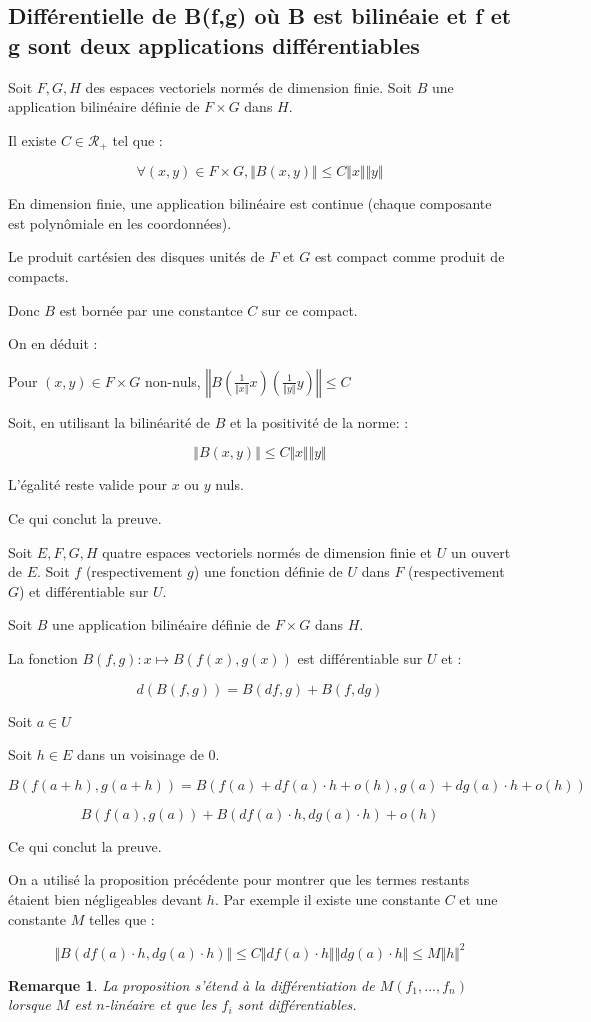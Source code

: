 \documentclass[a4paper,12pt]{book}
\newcommand{\Prop}[2]{\begin{tcolorbox}[sharp corners, colback=white,colframe=red!90!black!75, title=Proposition : #1]#2\end{tcolorbox}}
\newcommand{\Pre}[1]{\begin{tcolorbox}[sharp corners, colback=white,colframe=green!60!green!30!black!75, title=Preuve]#1\end{tcolorbox}}
\newtheorem{Rem}{Remarque}[section]
\begin{document}
\subsection{Différentielle de B(f,g) où B est bilinéaie et f et g sont deux applications différentiables}
\Prop{}{Soit $F, G, H$ des espaces vectoriels normés de dimension finie. Soit $B$ une application bilinéaire définie de $F\times G$ dans $H$.
\par Il existe $C\in\mathcal{R}_+$ tel que :
\par $$\forall (x, y)\in F\times G, \Vert B(x, y)\Vert\leq C\Vert x\Vert\Vert y\Vert$$}
\Pre{En dimension finie, une application bilinéaire est continue (chaque composante est polynômiale en les coordonnées).
\par Le produit cartésien des disques unités de $F$ et $G$ est compact comme produit de compacts.
\par Donc $B$ est bornée par une constantce $C$ sur ce compact.
\par On en déduit :
\par Pour $(x,y)\in F\times G$ non-nuls, $\left\Vert B\left(\frac{1}{\Vert x\Vert}x\right)\left(\frac{1}{\Vert y\Vert}y\right)\right\Vert\leq C$
\par Soit, en utilisant la bilinéarité de $B$ et la positivité de la norme: :
\par $$ \Vert B(x, y)\Vert\leq C\Vert x\Vert\Vert y\Vert$$
\par L'égalité reste valide pour $x$ ou $y$ nuls.
\par Ce qui conclut la preuve.}
\Prop{}{Soit $E, F, G, H$ quatre espaces vectoriels normés de dimension finie et $U$ un ouvert de $E$. Soit $f$ (respectivement $g$) une fonction définie de $U$ dans $F$ (respectivement $G$) et différentiable sur $U$.
\par Soit $B$ une application bilinéaire définie de $F\times G$ dans $H$.
\par La fonction $B(f, g):x\mapsto B(f(x), g(x))$ est différentiable sur $U$ et :
\par $$d(B(f, g)) = B(df, g)+B(f, dg)$$}
\Pre{Soit $a\in U$
\par Soit $h\in E$ dans un voisinage de $0$.
\par $$B(f(a+h), g(a+h)) = B(f(a)+df(a)\cdot h+o(h), g(a)+dg(a)\cdot h+o(h))$$
\par $$B(f(a), g(a))+B(df(a)\cdot h, dg(a)\cdot h)+o(h)$$
\par Ce qui conclut la preuve.
\par On a utilisé la proposition précédente pour montrer que les termes restants étaient bien négligeables devant $h$. Par exemple il existe une constante $C$ et une constante $M$ telles que :
\par $$ \Vert B(df(a)\cdot h, dg(a)\cdot h)\Vert\leq C\Vert df(a)\cdot h\Vert\Vert dg(a)\cdot h\Vert\leq M\Vert h\Vert^2$$}
\begin{Rem}
La proposition s'étend à la différentiation de $M(f_1,..., f_n)$ lorsque $M$ est $n$-linéaire et que les $f_i$ sont différentiables.
\end{Rem}
\end{document}
